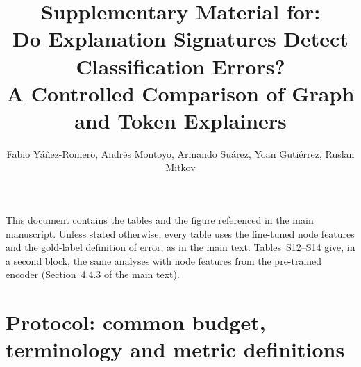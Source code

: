 \documentclass[review,12pt]{elsarticle}
\begin{document}
\begin{frontmatter}
\title{Supplementary Material for:\\
Do Explanation Signatures Detect Classification Errors?\\
A Controlled Comparison of Graph and Token Explainers}
\author{Fabio Y\'a\~nez-Romero, Andr\'es Montoyo, Armando Su\'arez, Yoan Guti\'errez, Ruslan Mitkov}
\end{frontmatter}

\noindent This document contains the tables and the figure referenced in the main manuscript. Unless stated otherwise, every table uses the fine-tuned node features and the gold-label definition of error, as in the main text. Tables~S12--S14 give, in a second block, the same analyses with node features from the pre-trained encoder (Section~4.4.3 of the main text).

\section{Protocol: common budget, terminology and metric definitions}
\end{document}
